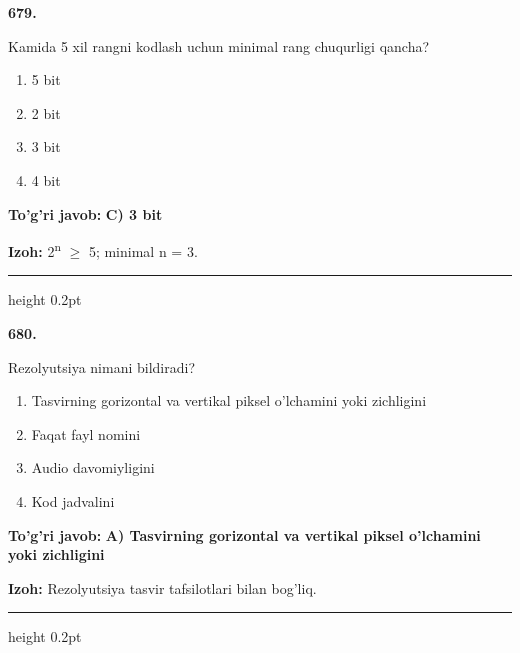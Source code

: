 \documentclass[10pt,a4paper,oneside]{article}
\begin{document}
\noindent\textbf{\color{ink}679.}
\par
Kamida 5 xil rangni kodlash uchun minimal rang chuqurligi qancha?
\begin{enumerate}[label=\Alph*),leftmargin=9mm]
\item 5 bit
\item 2 bit
\item 3 bit
\item 4 bit
\end{enumerate}
\begin{tcolorbox}[enhanced,breakable,colback=teal!4,colframe=teal!50!black,boxrule=0.5pt,arc=1.1mm,left=3mm,right=3mm,top=1.7mm,bottom=1.7mm,before skip=2mm,after skip=2mm]
\textbf{\color{teal}To'g'ri javob:} \textbf{C) 3 bit}
\par\smallskip
\textbf{Izoh:} 2\textsuperscript{n} \ensuremath{\geq} 5; minimal n = 3.
\end{tcolorbox}
\vspace{2mm}\hrule height 0.2pt \vspace{3mm}

\noindent\textbf{\color{ink}680.}
\par
Rezolyutsiya nimani bildiradi?
\begin{enumerate}[label=\Alph*),leftmargin=9mm]
\item Tasvirning gorizontal va vertikal piksel o'lchamini yoki zichligini
\item Faqat fayl nomini
\item Audio davomiyligini
\item Kod jadvalini
\end{enumerate}
\begin{tcolorbox}[enhanced,breakable,colback=teal!4,colframe=teal!50!black,boxrule=0.5pt,arc=1.1mm,left=3mm,right=3mm,top=1.7mm,bottom=1.7mm,before skip=2mm,after skip=2mm]
\textbf{\color{teal}To'g'ri javob:} \textbf{A) Tasvirning gorizontal va vertikal piksel o'lchamini yoki zichligini}
\par\smallskip
\textbf{Izoh:} Rezolyutsiya tasvir tafsilotlari bilan bog'liq.
\end{tcolorbox}
\vspace{2mm}\hrule height 0.2pt \vspace{3mm}
\end{document}
